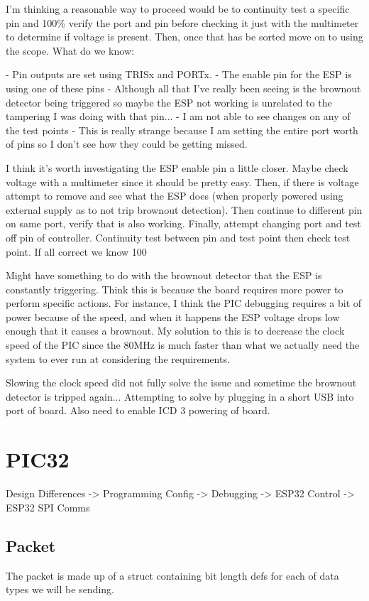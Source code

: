 I'm thinking a reasonable way to proceed would be to continuity test
a specific pin and 100\% verify the port and pin before checking it just
with the multimeter to determine if voltage is present. Then, once that
has be sorted move on to using the scope.
What do we know:

    - Pin outputs are set using TRISx and PORTx.
    - The enable pin for the ESP is using one of these pins
        - Although all that I've really been seeing
        is the brownout detector being triggered
        so maybe the ESP not working is unrelated to the
        tampering I was doing with that pin...
    - I am not able to see changes on any of the test points
        - This is really strange because I am setting the entire port
        worth of pins so I don't see how they could be getting missed.

I think it's worth investigating the ESP enable pin a little closer.
Maybe check voltage with a multimeter since it should be pretty easy.
Then, if there is voltage attempt to remove and see what the ESP does
(when properly powered using external supply as to not trip
brownout detection).
Then continue to different pin on same port, verify that is also working.
Finally, attempt changing port and test off pin of controller.
Continuity test between pin and test point then check test point.
If all correct we know 100%

Might have something to do with the brownout detector that the ESP is constantly triggering.
Think this is because the board requires more power to perform specific actions.
For instance, I think the PIC debugging requires a bit of power because of the speed,
and when it happens the ESP voltage drops low enough that it causes a brownout.
My solution to this is to decrease the clock speed of the PIC since the 80MHz is much
faster than what we actually need the system to ever run at considering the requirements.

Slowing the clock speed did not fully solve the issue and sometime the brownout detector
is tripped again...
Attempting to solve by plugging in a short USB into port of board.
Also need to enable ICD 3 powering of board.

\section{PIC32}
Design Differences -> Programming Config -> Debugging -> ESP32 Control -> ESP32 SPI Comms

\subsection{Packet}
%
The packet is made up of a struct containing bit length defs
for each of data types we will be sending.

